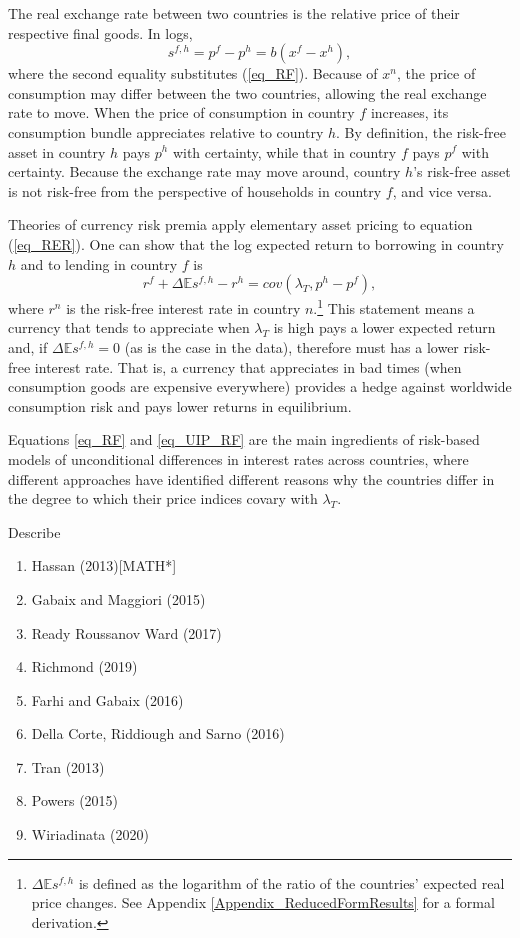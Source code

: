 \documentclass[12pt,letter]{article}
\theoremstyle{break} \theorembodyfont{\normalfont\itshape}
\theoremstyle{break}
\theoremstyle{break} \theorembodyfont{\normalfont\itshape}
\theoremstyle{break} \theorembodyfont{\normalfont\itshape}
\begin{document}
The real exchange rate between two countries is the relative price of
their respective final goods. In logs,
\begin{equation}
  s^{f,h}=p^{f}-p^{h}=b(x^{f}-x^{h}),
\end{equation}\label{eq_RER}
where the second equality substitutes (\ref{eq_RF}).
Because of $x^{n}$, the price of consumption may differ between the two countries, allowing the real exchange rate to move. When the price of consumption in country $f$ increases, its consumption bundle appreciates relative to country $h$. By definition, the risk-free asset in country $h$ pays $p^h$ with certainty, while that in country $f$ pays $p^f$ with certainty. Because the exchange rate may move around, country $h$'s risk-free asset is not risk-free from the perspective of households in country $f$, and vice versa.

Theories of currency risk premia apply
elementary asset pricing to equation (\ref{eq_RER}). One can show that the log expected return to
borrowing in country $h$ and to lending in country $f$ is
\begin{equation}
  r^{f} + \Delta \mathbb{E} s^{f,h} - r^{h} =cov\left( \lambda _{T},p^{h}-p^{f}\right),
  \label{eq_UIP_RF}
\end{equation}%
where $r^{n}$ is the risk-free interest rate in country $n$.\footnote{$\Delta\mathbb{E}s^{f,h}$ is defined as the
  logarithm of the ratio of the countries' expected real price
  changes. See Appendix \ref{Appendix_ReducedFormResults} for a formal
  derivation.} This statement means a currency that tends to
appreciate when $\lambda_T$ is high pays a lower expected return and,
if $\Delta \mathbb{E} s^{f,h}=0$ (as is the case in the data), therefore must has a lower risk-free interest
rate. That is, a currency that appreciates in bad times (when
consumption goods are expensive everywhere) provides a
hedge against worldwide consumption risk and pays lower returns in
equilibrium.

Equations \eqref{eq_RF} and \eqref{eq_UIP_RF} are the main ingredients
of risk-based models of unconditional differences in interest rates
across countries, where different approaches have identified different reasons why the countries differ in the degree to which their price indices covary with $\lambda_T$.

Describe
\begin{enumerate}
\item Hassan (2013)[MATH*]
\item Gabaix and Maggiori (2015)
\item Ready Roussanov Ward (2017)
\item Richmond (2019)
\item Farhi and Gabaix (2016)
\item Della Corte, Riddiough and Sarno (2016)
\item Tran (2013)
\item Powers (2015)
\item Wiriadinata (2020)
\end{enumerate}
\end{document}

